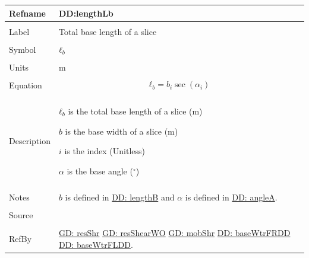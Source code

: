 \documentclass[12pt]{article}
\begin{document}
\noindent \begin{minipage}{\textwidth}
\begin{tabular}{p{} p{}}
\toprule \textbf{Refname} & \textbf{DD:lengthLb}
\label{DD:lengthLb}
\\ \midrule \\
Label & Total base length of a slice
        \\ \midrule \\
        Symbol & ${ℓ_{b}}$
                 \\ \midrule \\
                 Units & m
                         \\ \midrule \\
                         Equation & \begin{displaymath}
                                    {ℓ_{b}}=b_{i} \sec\left(α_{i}\right)
                                    \end{displaymath}
                                    \\ \midrule \\
                                    Description & \begin{symbDescription}
                                                  \item{${ℓ_{b}}$ is the total base length of a slice (m)}
                                                  \item{$b$ is the base width of a slice (m)}
                                                  \item{$i$ is the index (Unitless)}
                                                  \item{$α$ is the base angle (${}^{\circ}$)}
                                                  \end{symbDescription}
                                                  \\ \midrule \\
                                                  Notes & $b$ is defined in \hyperref[DD:lengthB]{DD: lengthB} and $α$ is defined in \hyperref[DD:angleA]{DD: angleA}.
                                                          \\ \midrule \\
                                                          Source & \cite{fredlund1977}
                                                                   \\ \midrule \\
                                                                   RefBy & \hyperref[GD:resShr]{GD: resShr} \hyperref[GD:resShearWO]{GD: resShearWO} \hyperref[GD:mobShr]{GD: mobShr} \hyperref[DD:baseWtrFRDD]{DD: baseWtrFRDD} \hyperref[DD:baseWtrFLDD]{DD: baseWtrFLDD}.
\\ \bottomrule \end{tabular}
\end{minipage}
\par~
\end{document}
